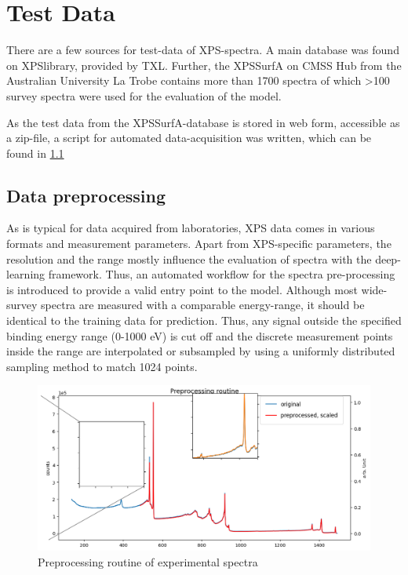 \label{test_data}
\section{Test Data}

There are a few sources for test-data of XPS-spectra. A main database was found on XPSlibrary, provided by TXL. Further, the XPSSurfA on CMSS Hub from the Australian University La Trobe contains more than 1700 spectra of which >100 survey spectra were used for the evaluation of the model.

As the test data from the XPSSurfA-database is stored in web form, accessible as a zip-file, a script for automated data-acquisition was written, which can be found in \ref{}

\subsection{Data preprocessing}

As is typical for data acquired from laboratories, XPS data comes in various formats and measurement parameters. Apart from XPS-specific parameters, the resolution and the range mostly influence the evaluation of spectra with the deep-learning framework. Thus, an automated workflow for the spectra pre-processing is introduced to provide a valid entry point to the model.
Although most wide-survey spectra are measured with a comparable energy-range, it should be identical to the training data for prediction. Thus, any signal outside the specified binding energy range (0-1000 eV) is cut off and the discrete measurement points inside the range are interpolated or subsampled by using a uniformly distributed sampling method to match 1024 points.

\begin{figure}
    \centering
    \includegraphics[width=\textwidth]{Figures/preprocessing_routine.png}
    \caption{Preprocessing routine of experimental spectra}
    \label{fig:preproc_routine}
\end{figure}


